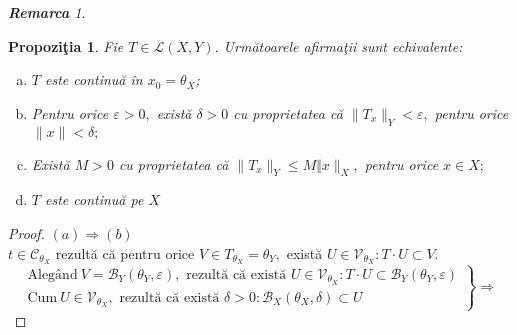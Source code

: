 \documentclass[ a4paper, 12pt]{report}
\newtheorem{prop}[theorem]{\bf Propozi\c tia }
\theoremstyle{definition}
\theoremstyle{remark}
\newtheorem{remarc}{\bf Remarca}[section]
\numberwithin{equation}{section}
\begin{document}
\begin{remarc}
\begin{prop}
Fie $T \in \mathcal{L}(X,Y).$ Urm\u atoarele afirma\c tii sunt echivalente:
\begin{enumerate}[(a)]
\item $T$ este continu\u a \^in $x_0 = \theta_{X}$;
\item Pentru orice $\varepsilon>0,$ exist\u a $\delta>0$ cu proprietatea c\u a $\lVert T_x \rVert_Y<\varepsilon,$ pentru orice $\lVert x \rVert<\delta;$
\item Exist\u a $M>0$ cu proprietatea c\u a $\lVert T_x \rVert_Y \leq M \Vert x \rVert_X,$ pentru orice $x \in X;$
\item $T$ este continu\u a pe $X$
\end{enumerate}
\end{prop}
\begin{proof}
$(a) \Longrightarrow (b)$\\
$t \in \mathcal{C}_{\theta_{X}}$ rezult\u a c\u a pentru orice $V \in T_{\theta_{X}} = \theta_{Y},$ exist\u a $U \in \mathcal{V}_{\theta_{X}}: T \cdot U \subset V.$
\begin{equation*}
  \left.\begin{aligned}
         \mbox{Aleg\^and}\  V = \mathcal{B}_{Y}(\theta_{Y}, \varepsilon), \mbox{ rezult\u a c\u a exist\u a } U \in \mathcal{V}_{\theta_{X}}: T \cdot U \subset \mathcal{B}_{Y}(\theta_{Y}, \varepsilon)\\
         \mbox{Cum}\ U \in \mathcal{V}_{\theta_{X}}, \mbox{ rezult\u a c\u a exist\u a } \delta>0: \mathcal{B}_{X}(\theta_{X}, \delta) \subset U
        \end{aligned}
  \right\}
  \mbox{$\Rightarrow$}
 \end{equation*}


\end{proof}
\end{remarc}
\end{document}

